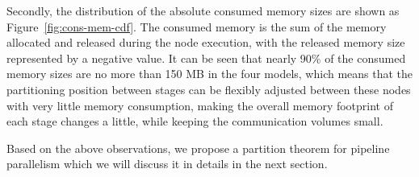 Secondly, the distribution of the absolute consumed memory sizes are shown as Figure~\ref{fig:cons-mem-cdf}.
The consumed memory is the sum of the memory allocated and released during the node execution,
with the released memory size represented by a negative value.
It can be seen that nearly 90\% of
the consumed memory sizes are no more than 150 MB in the four models,
which means that the partitioning position between stages can be
flexibly adjusted between these nodes with very little memory consumption,
making the overall memory footprint of each stage changes a little,
while keeping the communication volumes small. %

Based on the above observations, we propose a partition theorem for
pipeline parallelism which we will discuss it in details in the next section.
